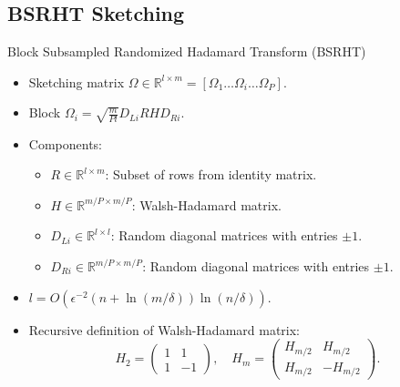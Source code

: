\documentclass[aspectratio=169, xcolor=table]{beamer}
\begin{document}
\subsection{BSRHT Sketching}
\begin{frame}{Block Subsampled Randomized Hadamard Transform (BSRHT)}
  \begin{itemize}
    \item Sketching matrix $\Omega \in \mathbb{R}^{l\times m} = [\Omega_1 \ldots \Omega_i \ldots \Omega_P]$.
    \item Block  $\Omega_i = \sqrt{\frac{m}{Pl}}D_{Li}RHD_{Ri}$.
    \item Components:
      \begin{itemize}
        \item $R \in \mathbb{R}^{l\times m}$: Subset of rows from identity matrix.
        \item $H \in \mathbb{R}^{m/P\times m/P}$: Walsh-Hadamard matrix.
        \item $D_{Li} \in \mathbb{R}^{l\times l}$: Random diagonal matrices with entries $\pm 1$.
        \item $D_{Ri} \in \mathbb{R}^{m/P\times m/P}$: Random diagonal matrices with entries $\pm 1$.
      \end{itemize}
    \item $l = O(\epsilon^{-2}(n + \ln(m/\delta))\ln(n/\delta))$.
    \item Recursive definition of Walsh-Hadamard matrix:
      \[
      H_2 = \begin{pmatrix} 1 & 1 \\ 1 & -1 \end{pmatrix}, \quad H_m = \begin{pmatrix} H_{m/2} & H_{m/2} \\ H_{m/2} & -H_{m/2} \end{pmatrix}.
      \]
  \end{itemize}
\end{frame}
\end{document}
